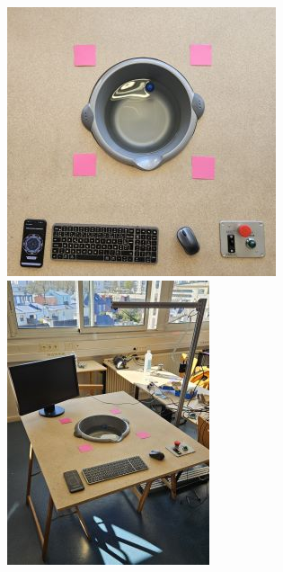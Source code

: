 \documentclass{article}
\begin{document}
\begin{figure}[H]
\begin{minipage}{0.32\textwidth}
        \includegraphics[width=\linewidth, angle=0]{Images/photoFabrications/final (4).jpg}
    \end{minipage}\hfill
    \begin{minipage}{0.32\textwidth}
        \centering
        \includegraphics[width=\linewidth, angle=0]{Images/photoFabrications/final (3).jpg}
        

\end{minipage}
\end{figure}
\end{document}
